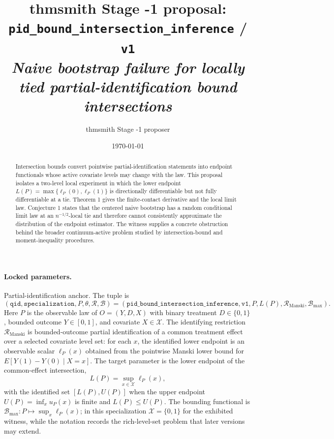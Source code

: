 \documentclass[11pt]{article}
\title{thmsmith Stage -1 proposal: \texttt{pid\_bound\_intersection\_inference} / \texttt{v1}%
  \\ \large\textit{Naive bootstrap failure for locally tied partial-identification bound intersections}}
\author{thmsmith Stage -1 proposer}
\date{\today}
\theoremstyle{definition}
\theoremstyle{plain}
\theoremstyle{remark}
\begin{document}
\maketitle


\paragraph{Locked parameters.}
Partial-identification anchor. The tuple is
\[
(\texttt{qid},\texttt{specialization},P,\theta,\mathcal R,\mathcal B)
=
(\texttt{pid\_bound\_intersection\_inference},\texttt{v1},P,L(P),\mathcal R_{\mathrm{Manski}},\mathcal B_{\max}).
\]
Here \(P\) is the observable law of \(O=(Y,D,X)\) with binary treatment \(D\in\{0,1\}\), bounded outcome \(Y\in[0,1]\), and covariate \(X\in\mathcal X\). The identifying restriction \(\mathcal R_{\mathrm{Manski}}\) is bounded-outcome partial identification of a common treatment effect over a selected covariate level set: for each \(x\), the identified lower endpoint is an observable scalar \(\ell_P(x)\) obtained from the pointwise Manski lower bound for \(E[Y(1)-Y(0)\mid X=x]\). The target parameter is the lower endpoint of the common-effect intersection,
\[
L(P)=\sup_{x\in\mathcal X}\ell_P(x),
\]
with the identified set \([L(P),U(P)]\) when the upper endpoint \(U(P)=\inf_x u_P(x)\) is finite and \(L(P)\le U(P)\). The bounding functional is \(\mathcal B_{\max}:P\mapsto \sup_x \ell_P(x)\); in this specialization \(\mathcal X=\{0,1\}\) for the exhibited witness, while the notation records the rich-level-set problem that later versions may extend.

\begin{abstract}
Intersection bounds convert pointwise partial-identification statements into endpoint functionals whose active covariate levels may change with the law. This proposal isolates a two-level local experiment in which the lower endpoint \(L(P)=\max\{\ell_P(0),\ell_P(1)\}\) is directionally differentiable but not fully differentiable at a tie. Theorem 1 gives the finite-contact derivative and the local limit law. Conjecture 1 states that the centered naive bootstrap has a random conditional limit law at an \(n^{-1/2}\)-local tie and therefore cannot consistently approximate the distribution of the endpoint estimator. The witness supplies a concrete obstruction behind the broader continuum-active problem studied by intersection-bound and moment-inequality procedures.
\end{abstract}
\end{document}
